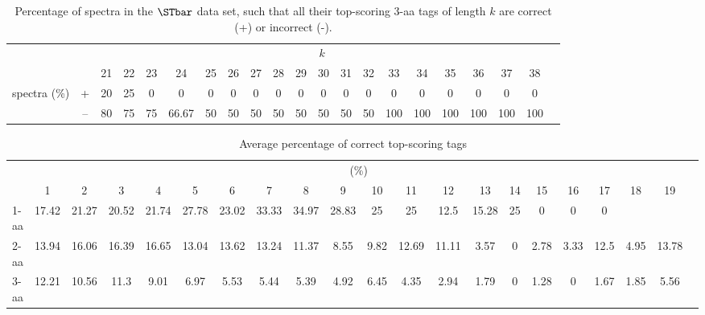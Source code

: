 \begin{table}[ht]\footnotesize
\vspace{3mm}
{\centering
\begin{center}
\begin{tabular}{|c|c|c|c|c|c|c|c|c|c|c|c|c|c|c|c|c|c|c|c|c|}
  \hline
  \multicolumn{2}{|c|}{ } & \multicolumn{ 18}{|c|}{$k$} \\
  \cline{3-20 }
  \multicolumn{2}{|c|}{ } 
 & 21 & 22 & 23 & 24 & 25 & 26 & 27 & 28 & 29 & 30 & 31 & 32 & 33 & 34 & 35 & 36 & 37 & 38\\
  \hline
  \multirow{2}{*}{spectra (\%)} & +  & 20 & 25 & 0 & 0 & 0 & 0 & 0 & 0 & 0 & 0 & 0 & 0 & 0 & 0 & 0 & 0 & 0 & 0 \\
      & --  & 80 & 75 & 75 & 66.67 & 50 & 50 & 50 & 50 & 50 & 50 & 50 & 50 & 100 & 100 & 100 & 100 & 100 & 100 \\
  \hline
\end{tabular}
\end{center}
\par}
\centering

\caption{Percentage of spectra in the $\STbar$ data set, such that all their top-scoring 3-aa tags of length $k$ are correct (+) or incorrect (-).}

\vspace{3mm}
\label{table:all-top-scoring}
\end{table}
\begin{table}[h]\tiny
\vspace{3mm}
{\centering
\begin{center}
\begin{tabular}{|l|c|c|c|c|c|c|c|c|c|c|c|c|c|c|c|c|c|c|c|c|}
  \hline
  & \multicolumn{ 19 }{|c|}{(\%)} \\
  \cline{2- 20}
    & 1 & 2 & 3 & 4 & 5 & 6 & 7 & 8 & 9 & 10 & 11 & 12 & 13 & 14 & 15 & 16 & 17 & 18 & 19\\
  \hline
1-aa  & 17.42 & 21.27 & 20.52 & 21.74 & 27.78 & 23.02 & 33.33 & 34.97 & 28.83 & 25 & 25 & 12.5 & 15.28 & 25 & 0 & 0 & 0 &  & \\
2-aa  & 13.94 & 16.06 & 16.39 & 16.65 & 13.04 & 13.62 & 13.24 & 11.37 & 8.55 & 9.82 & 12.69 & 11.11 & 3.57 & 0 & 2.78 & 3.33 & 12.5 & 4.95 & 13.78\\
3-aa  & 12.21 & 10.56 & 11.3 & 9.01 & 6.97 & 5.53 & 5.44 & 5.39 & 4.92 & 6.45 & 4.35 & 2.94 & 1.79 & 0 & 1.28 & 0 & 1.67 & 1.85 & 5.56\\
 \hline
\end{tabular}
\end{center}
\par}
\centering
\caption{ Average percentage of correct top-scoring tags}
\vspace{3mm}
\label{table:k}
\end{table}
